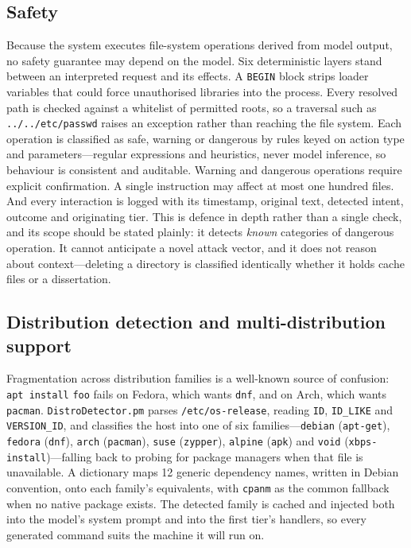 \documentclass[10pt,a4paper]{article}
\begin{document}
\subsection{Safety}
\label{subsec:safety}

Because the system executes file-system operations derived from model output, no safety guarantee may depend on the model. Six deterministic layers stand between an interpreted request and its effects. A \texttt{BEGIN} block strips loader variables that could force unauthorised libraries into the process. Every resolved path is checked against a whitelist of permitted roots, so a traversal such as \texttt{../../etc/passwd} raises an exception rather than reaching the file system. Each operation is classified as safe, warning or dangerous by rules keyed on action type and parameters---regular expressions and heuristics, never model inference, so behaviour is consistent and auditable. Warning and dangerous operations require explicit confirmation. A single instruction may affect at most one hundred files. And every interaction is logged with its timestamp, original text, detected intent, outcome and originating tier. This is defence in depth rather than a single check, and its scope should be stated plainly: it detects \emph{known} categories of dangerous operation. It cannot anticipate a novel attack vector, and it does not reason about context---deleting a directory is classified identically whether it holds cache files or a dissertation.

\subsection{Distribution detection and multi-distribution support}
\label{subsec:distro}

Fragmentation across distribution families is a well-known source of confusion: \texttt{apt install} \texttt{foo} fails on Fedora, which wants \texttt{dnf}, and on Arch, which wants \texttt{pacman}. \texttt{DistroDetector.pm} parses \texttt{/etc/os-release}, reading \texttt{ID}, \texttt{ID\_LIKE} and \texttt{VERSION\_ID}, and classifies the host into one of six families---\texttt{debian} (\texttt{apt-get}), \texttt{fedora} (\texttt{dnf}), \texttt{arch} (\texttt{pacman}), \texttt{suse} (\texttt{zypper}), \texttt{alpine} (\texttt{apk}) and \texttt{void} (\texttt{xbps-install})---falling back to probing for package managers when that file is unavailable. A dictionary maps 12 generic dependency names, written in Debian convention, onto each family's equivalents, with \texttt{cpanm} as the common fallback when no native package exists. The detected family is cached and injected both into the model's system prompt and into the first tier's handlers, so every generated command suits the machine it will run on.
\end{document}
